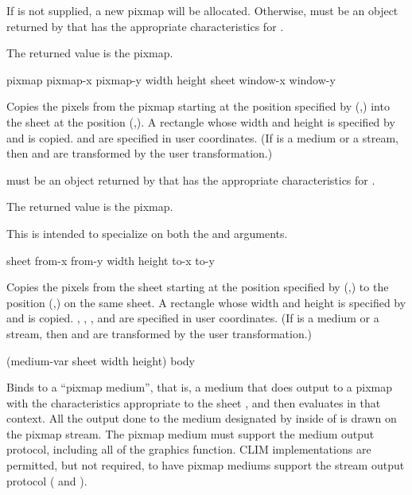 If  is not supplied, a new pixmap will be allocated.  Otherwise,
 must be an object returned by  that has the
appropriate characteristics for . 

The returned value is the pixmap.

 {pixmap pixmap-x pixmap-y width height
                                sheet window-x window-y}

Copies the pixels from the pixmap  starting at the position
specified by (,) into the sheet  at the
position (,).  A rectangle whose width and height is
specified by  and  is copied.   and
 are specified in user coordinates.  (If  is a medium or
a stream, then  and  are transformed by the user
transformation.)

 must be an object returned by  that has the
appropriate characteristics for .

The returned value is the pixmap.

This is intended to specialize on both the  and 
arguments.

 {sheet from-x from-y width height to-x to-y}

Copies the pixels from the sheet  starting at the position specified
by (,) to the position (,) on the
same sheet.  A rectangle whose width and height is specified by  and
 is copied.  , , , and 
are specified in user coordinates.  (If  is a medium or a stream,
then  and  are transformed by the user
transformation.)


 {(medium-var sheet \key width height) \body body}

Binds  to a ``pixmap medium'', that is, a medium that does
output to a pixmap with the characteristics appropriate to the sheet
, and then evaluates  in that context.  All the output done
to the medium designated by  inside of  is drawn on
the pixmap stream.  The pixmap medium must support the medium output protocol,
including all of the graphics function.  CLIM implementations are permitted, but
not required, to have pixmap mediums support the stream output protocol
( and ).

